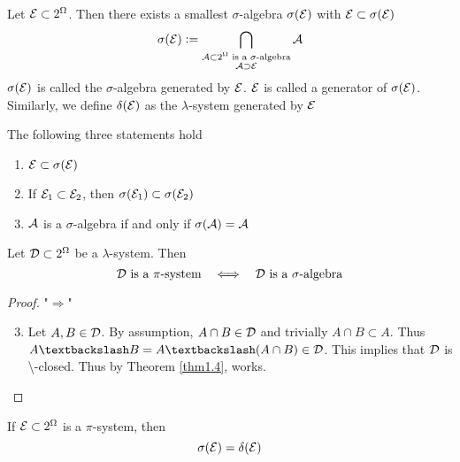 \documentclass[11pt]{article}
\begin{document}
\begin{theorem}
Let \(\mathcal{E}\subset2^\Omega\). Then there exists a smallest \(\sigma\)-algebra 
\(\sigma(\mathcal{E})\) with \(\mathcal{E}\subset\sigma(\mathcal{E})\)
\begin{equation*}
\sigma(\mathcal{E}):=\displaystyle\bigcap_{\substack{\mathcal{A}\subset2^\Omega
\text{ is a }\sigma\text{-algebra}\\\mathcal{A}\supset\mathcal{E}}}\mathcal{A}
\end{equation*}
\(\sigma(\mathcal{E})\) is called the \(\sigma\)-algebra generated by \(\mathcal{E}\). \(\mathcal{E}\) is
called a generator of \(\sigma(\mathcal{E})\). Similarly, we define \(\delta(\mathcal{E})\)
as the \(\lambda\)-system generated by \(\mathcal{E}\)
\end{theorem}

\begin{remark}
The following three statements hold 
\begin{enumerate}
\item \(\mathcal{E}\subset\sigma(\mathcal{E})\)
\item If \(\mathcal{E}_1\subset\mathcal{E}_2\), then \(\sigma(\mathcal{E}_1)\subset\sigma(\mathcal{E}_2)\)
\item \(\mathcal{A}\) is a \(\sigma\)-algebra if and only if \(\sigma(\mathcal{A})=\mathcal{A}\)
\end{enumerate}
\end{remark}

\begin{theorem}
\label{thm1.18}
Let \(\mathcal{D}\subset2^\Omega\) be a \(\lambda\)-system. Then 
\begin{equation*}
\mathcal{D}\text{ is a }\pi\text{-system}\quad\Longleftrightarrow\quad
\mathcal{D}\text{ is a }\sigma\text{-algebra}
\end{equation*}
\end{theorem}

\begin{proof}
"\(\Longrightarrow\)"
\begin{enumerate}
\setcounter{enumi}{2}
\item Let \(A,B\in\mathcal{D}\). By assumption, \(A\cap B\in\mathcal{D}\) and trivially
\(A\cap B\subset A\). Thus \(A\textbackslash B=A\textbackslash(A\cap
      B)\in\cald\). This implies that \(\mathcal{D}\) is \textbackslash-closed. Thus by
Theorem \ref{thm1.4}, works.
\end{enumerate}
\end{proof}


\begin{theorem}
If \(\mathcal{E}\subset2^\Omega\) is a \(\pi\)-system, then
\begin{equation*}
\sigma(\mathcal{E})=\delta(\mathcal{E})
\end{equation*}
\end{theorem}
\end{document}
